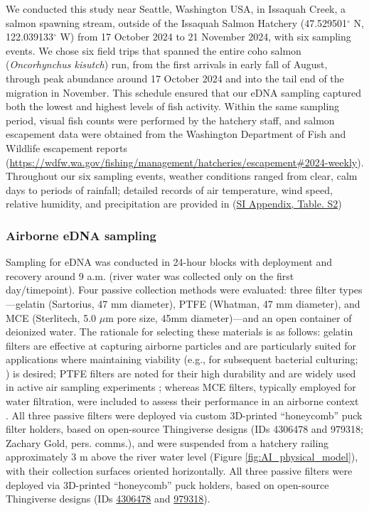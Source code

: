 \documentclass{article}
\begin{document}
We conducted this study near Seattle, Washington USA, in Issaquah Creek, a salmon spawning stream, outside of the Issaquah Salmon Hatchery (47.529501$^\circ$ N, 122.039133$^\circ$ W) from 17 October 2024 to 21 November 2024, with six sampling events. We chose six field trips that spanned the entire coho salmon (\textit{Oncorhynchus kisutch}) run, from the first arrivals in early fall of August, through peak abundance around 17 October 2024 and into the tail end of the migration in November. This schedule ensured that our eDNA sampling captured both the lowest and highest levels of fish activity. Within the same sampling period, visual fish counts were performed by the hatchery staff, and salmon escapement data were obtained from the Washington Department of Fish and Wildlife escapement reports (\href{https://wdfw.wa.gov/fishing/management/hatcheries/escapement#2024-weekly}{https://wdfw.wa.gov/fishing/management/hatcheries/escapement\#2024-weekly}). Throughout our six sampling events, weather conditions ranged from clear, calm days to periods of  rainfall; detailed records of air temperature, wind speed, relative humidity, and precipitation are provided in (\href{SI_Appendix.pdf}{SI Appendix, Table. S2})

\subsubsection{Airborne eDNA sampling}
Sampling for eDNA was conducted in 24-hour blocks with deployment and recovery around 9 a.m. (river water was collected only on the first day/timepoint). Four passive collection methods were evaluated: three filter types—gelatin (Sartorius, 47 mm diameter), PTFE (Whatman, 47 mm diameter), and MCE (Sterlitech, 5.0 $\mu$m pore size, 45mm diameter)—and an open container of deionized water. The rationale for selecting these materials is as follows: gelatin filters are effective at capturing airborne particles and are particularly suited for applications where maintaining viability (e.g., for subsequent bacterial culturing; \cite{wu2010}) is desired; PTFE filters are noted for their high durability and are widely used in active air sampling experiments \cite{harnpicharnchai2023}; whereas MCE filters, typically employed for water filtration, were included to assess their performance in an airborne context \cite{allan2023}. All three passive filters were deployed via custom 3D-printed “honeycomb” puck filter holders, based on open-source Thingiverse designs (IDs 4306478 and 979318; Zachary Gold, pers. comms.), and were suspended from a hatchery railing approximately 3 m above the river water level (Figure \ref{fig:AI_physical_model}), with their collection surfaces oriented horizontally. All three passive filters were deployed via 3D-printed “honeycomb” puck holders, based on open-source Thingiverse designs (IDs \href{https://www.thingiverse.com/thing:4306478}{4306478} and \href{https://www.thingiverse.com/thing:979318}{979318}).
\end{document}
